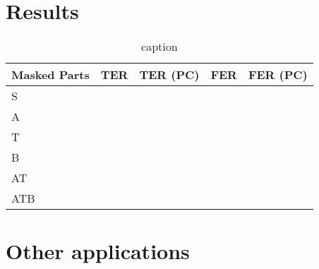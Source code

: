 \documentclass[dissertation.tex]{subfiles}
\begin{document}
\section{Results}

\begin{table}[htpb]
  \centering
  \caption{caption}
  \begin{tabular}{lcccc}
    \toprule
    Masked Parts & TER & TER (PC) & FER & FER (PC) \\
    \midrule
    S & & & & \\
    A & & & & \\
    T & & & & \\
    B & & & & \\
    AT & & & & \\
    ATB & & & & \\
    \bottomrule
  \end{tabular}
  \label{tab:harmonization-ters}
\end{table}

\section{Other applications}



\printbibliography
\end{document}
